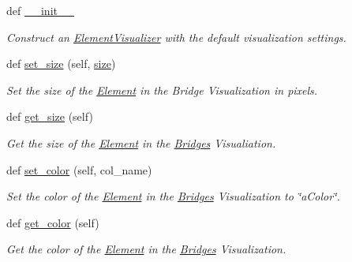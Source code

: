 \begin{DoxyCompactItemize}
\item 
def \hyperlink{class_bridges_1_1_element_visualizer_1_1_element_visualizer_abb05aa29c64e333b70e745639cfe4400}{\+\_\+\+\_\+init\+\_\+\+\_\+}
\begin{DoxyCompactList}\small\item\em Construct an \hyperlink{class_bridges_1_1_element_visualizer_1_1_element_visualizer}{Element\+Visualizer} with the default visualization settings. \end{DoxyCompactList}\item 
def \hyperlink{class_bridges_1_1_element_visualizer_1_1_element_visualizer_a7e309ec1893bd855c25d6efaf45711f8}{set\+\_\+size} (self, \hyperlink{class_bridges_1_1_element_visualizer_1_1_element_visualizer_a5d3eefae7745c6db65147c7b1361d208}{size})
\begin{DoxyCompactList}\small\item\em Set the size of the \hyperlink{namespace_bridges_1_1_element}{Element} in the Bridge Visualization in pixels. \end{DoxyCompactList}\item 
def \hyperlink{class_bridges_1_1_element_visualizer_1_1_element_visualizer_a12bbfd402a0e05e625d36f0ef5a3bcef}{get\+\_\+size} (self)
\begin{DoxyCompactList}\small\item\em Get the size of the \hyperlink{namespace_bridges_1_1_element}{Element} in the \hyperlink{namespace_bridges_1_1_bridges}{Bridges} Visualiation. \end{DoxyCompactList}\item 
def \hyperlink{class_bridges_1_1_element_visualizer_1_1_element_visualizer_aceb8f72766f7656162d0942891fc8f09}{set\+\_\+color} (self, col\+\_\+name)
\begin{DoxyCompactList}\small\item\em Set the color of the \hyperlink{namespace_bridges_1_1_element}{Element} in the \hyperlink{namespace_bridges_1_1_bridges}{Bridges} Visualization to \char`\"{}a\+Color\char`\"{}. \end{DoxyCompactList}\item 
def \hyperlink{class_bridges_1_1_element_visualizer_1_1_element_visualizer_ad53e64fed8aa62244cf0f83f2d7c2dcf}{get\+\_\+color} (self)
\begin{DoxyCompactList}\small\item\em Get the color of the \hyperlink{namespace_bridges_1_1_element}{Element} in the \hyperlink{namespace_bridges_1_1_bridges}{Bridges} Visualization. \end{DoxyCompactList}\item 

\end{DoxyCompactItemize}

